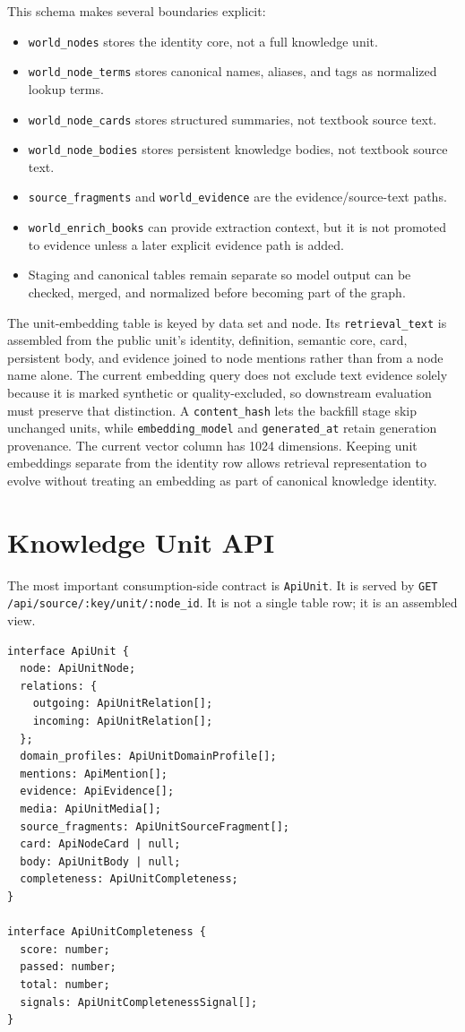 \documentclass[11pt,letterpaper]{article}
\newcommand{\code}[1]{\nolinkurl{#1}}
\begin{document}
This schema makes several boundaries explicit:

\begin{itemize}
  \item \code{world_nodes} stores the identity core, not a full knowledge unit.
  \item \code{world_node_terms} stores canonical names, aliases, and tags as normalized lookup terms.
  \item \code{world_node_cards} stores structured summaries, not textbook source text.
  \item \code{world_node_bodies} stores persistent knowledge bodies, not textbook source text.
  \item \code{source_fragments} and \code{world_evidence} are the evidence/source-text paths.
  \item \code{world_enrich_books} can provide extraction context, but it is not promoted to evidence unless a later explicit evidence path is added.
  \item Staging and canonical tables remain separate so model output can be checked, merged, and normalized before becoming part of the graph.
\end{itemize}

The unit-embedding table is keyed by data set and node. Its \code{retrieval_text} is assembled from the public unit's identity, definition, semantic core, card, persistent body, and evidence joined to node mentions rather than from a node name alone. The current embedding query does not exclude text evidence solely because it is marked synthetic or quality-excluded, so downstream evaluation must preserve that distinction. A \code{content_hash} lets the backfill stage skip unchanged units, while \code{embedding_model} and \code{generated_at} retain generation provenance. The current vector column has 1024 dimensions. Keeping unit embeddings separate from the identity row allows retrieval representation to evolve without treating an embedding as part of canonical knowledge identity.

\section{Knowledge Unit API}

The most important consumption-side contract is \code{ApiUnit}. It is served by \code{GET /api/source/:key/unit/:node_id}. It is not a single table row; it is an assembled view.

\begin{lstlisting}
interface ApiUnit {
  node: ApiUnitNode;
  relations: {
    outgoing: ApiUnitRelation[];
    incoming: ApiUnitRelation[];
  };
  domain_profiles: ApiUnitDomainProfile[];
  mentions: ApiMention[];
  evidence: ApiEvidence[];
  media: ApiUnitMedia[];
  source_fragments: ApiUnitSourceFragment[];
  card: ApiNodeCard | null;
  body: ApiUnitBody | null;
  completeness: ApiUnitCompleteness;
}

interface ApiUnitCompleteness {
  score: number;
  passed: number;
  total: number;
  signals: ApiUnitCompletenessSignal[];
}
\end{lstlisting}
\end{document}
